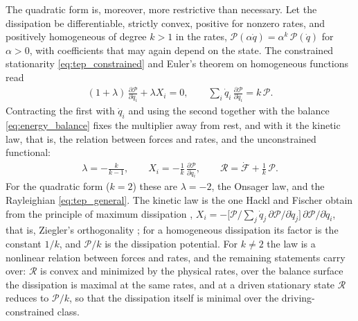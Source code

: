 \documentclass[aip,pof,reprint,amsmath,amssymb,longbibliography]{revtex4-2}
\begin{document}
The quadratic form is, moreover, more restrictive than necessary. Let the dissipation be differentiable, strictly convex, positive for nonzero rates, and positively homogeneous of degree $k > 1$ in the rates, $\mathcal{P}(\alpha \dot{q}) = \alpha^k\, \mathcal{P}(\dot{q})$ for $\alpha > 0$, with coefficients that may again depend on the state. The constrained stationarity \eqref{eq:tep_constrained} and Euler's theorem on homogeneous functions read
\begin{align}
    (1+\lambda)\, \frac{\partial\mathcal{P}}{\partial\dot{q}_i} + \lambda X_i = 0, \qquad \sum_i \dot{q}_i\, \frac{\partial\mathcal{P}}{\partial\dot{q}_i} = k\,\mathcal{P}. \label{eq:homogeneous_stationarity}
\end{align}
Contracting the first with $\dot{q}_i$ and using the second together with the balance \eqref{eq:energy_balance} fixes the multiplier away from rest, and with it the kinetic law, that is, the relation between forces and rates, and the unconstrained functional:
\begin{align}
    \lambda = -\frac{k}{k-1}, \qquad X_i = -\frac{1}{k}\, \frac{\partial \mathcal{P}}{\partial \dot{q}_i}, \qquad \mathcal{R} = \dot{\mathcal{F}} + \frac{1}{k}\,\mathcal{P}. \label{eq:homogeneous}
\end{align}
For the quadratic form ($k = 2$) these are $\lambda = -2$, the Onsager law, and the Rayleighian \eqref{eq:tep_general}. The kinetic law is the one Hackl and Fischer obtain from the principle of maximum dissipation \cite{hackl2008}, $X_i = -\big[\mathcal{P}/\sum_j \dot{q}_j\, \partial\mathcal{P}/\partial\dot{q}_j\big]\, \partial\mathcal{P}/\partial\dot{q}_i$, that is, Ziegler's orthogonality \cite{ziegler1963}; for a homogeneous dissipation its factor is the constant $1/k$, and $\mathcal{P}/k$ is the dissipation potential. For $k \neq 2$ the law is a nonlinear relation between forces and rates, and the remaining statements carry over: $\mathcal{R}$ is convex and minimized by the physical rates, over the balance surface the dissipation is maximal at the same rates, and at a driven stationary state $\mathcal{R}$ reduces to $\mathcal{P}/k$, so that the dissipation itself is minimal over the driving-constrained class.
\end{document}
